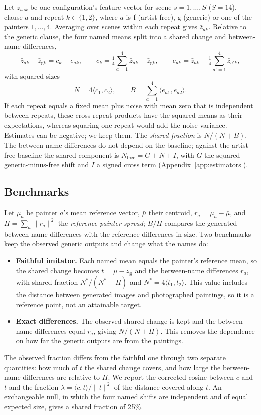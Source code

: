 \documentclass[10pt]{article}
\newcommand{\ip}[2]{\langle #1,#2\rangle}
\begin{document}
Let $z_{sak}$ be one configuration's feature vector for scene $s=1,\dots,S$ ($S=14$), clause $a$
and repeat $k\in\{1,2\}$, where $a$ is f (artist-free), g (generic) or one of the painters
$1,\dots,4$. Averaging over scenes within each repeat gives $\bar z_{ak}$. Relative to the
generic clause, the four named means split into a shared change and between-name differences,
\begin{equation}
\bar z_{ak}-\bar z_{\mathrm{g}k}=c_k+e_{ak},\qquad
c_k=\tfrac14\sum_{a=1}^4\bar z_{ak}-\bar z_{\mathrm{g}k},\qquad
e_{ak}=\bar z_{ak}-\tfrac14\sum_{a'=1}^4\bar z_{a'k},
\label{eq:split}
\end{equation}
with squared sizes
\begin{equation}
N=4\ip{c_1}{c_2},\qquad B=\sum_{a=1}^4\ip{e_{a1}}{e_{a2}}.
\label{eq:components}
\end{equation}
If each repeat equals a fixed mean plus noise with mean zero that is independent between
repeats, these cross-repeat products have the squared means as their expectations, whereas
squaring one repeat would add the noise variance. Estimates can be negative; we keep them. The
\emph{shared fraction} is $N/(N+B)$. The between-name differences do not depend on the baseline;
against the artist-free baseline the shared component is $N_{\mathrm{free}}=G+N+I$, with $G$ the
squared generic-minus-free shift and $I$ a signed cross term (Appendix~\ref{app:estimators}).

\subsection{Benchmarks}\label{sec:benchmarks}

Let $\mu_a$ be painter $a$'s mean reference vector, $\bar\mu$ their centroid, $r_a=\mu_a-\bar\mu$,
and $H=\sum_a\|r_a\|^2$ the \emph{reference painter spread}; $B/H$ compares the generated
between-name differences with the reference differences in size. Two benchmarks keep the observed
generic outputs and change what the names do:
\begin{itemize}
\item \textbf{Faithful imitator.} Each named mean equals the painter's reference mean, so the
shared change becomes $t=\bar\mu-\bar z_{\mathrm{g}}$ and the between-name differences $r_a$, with
shared fraction $N^*/(N^*+H)$ and $N^*=4\ip{t_1}{t_2}$. This value includes the distance between
generated images and photographed paintings, so it is a reference point, not an attainable target.
\item \textbf{Exact differences.} The observed shared change is kept and the between-name
differences equal $r_a$, giving $N/(N+H)$. This removes the dependence on how far the generic
outputs are from the paintings.
\end{itemize}
The observed fraction differs from the faithful one through two separate quantities: how much of
$t$ the shared change covers, and how large the between-name differences are relative to $H$.
We report the corrected cosine between $c$ and $t$ and the fraction $\lambda=\ip{c}{t}/\|t\|^2$ of
the distance covered along $t$. An exchangeable null, in which the four named shifts are
independent and of equal expected size, gives a shared fraction of 25\%.
\end{document}
